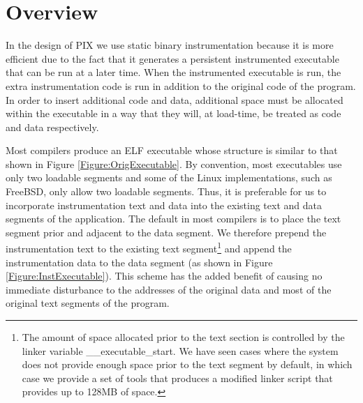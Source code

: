 \section{Overview}

In the design of PIX we use static binary instrumentation because it is more efficient
due to the fact that it generates a persistent instrumented executable 
that can be run at a later time. When the instrumented executable is
run, the extra instrumentation code is run
in addition to the original code of the program. In order to insert additional code
and data, additional space must be allocated within the executable in a way that they
will, at load-time, be treated as code and data respectively. 

Most compilers produce an ELF executable whose
structure is similar to that shown in Figure \ref{Figure:OrigExecutable}. By
convention, most executables use only two loadable segments and some of the Linux
implementations, such as FreeBSD, only allow two loadable segments. Thus, it is
preferable for us to incorporate instrumentation text and data into the
existing text and data segments of the application. The default in most
compilers is to place the text segment prior and adjacent to the data segment.
We therefore prepend the instrumentation text to the existing text
segment\footnote{The amount of space allocated prior to the text section is
controlled by the linker variable \_\_executable\_start. We have seen cases
where the system does not provide enough space prior to the text segment by
default, in which case we provide a set of tools that produces a modified linker
script that provides up to 128MB of space.} and append the instrumentation data to the
data segment (as shown in Figure \ref{Figure:InstExecutable}). This
scheme has the added benefit of causing no immediate disturbance to the
addresses of the original data and most of the original text segments of the program.

